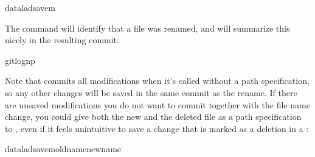 \begin{sphinxVerbatim}[commandchars=\\\{\}]
dataladsave\PYGZhy{}m
\end{sphinxVerbatim}

\sphinxAtStartPar
The  command will identify that a file was
renamed, and will summarize this nicely in the resulting commit:

%
\begin{sphinxVerbatim}[commandchars=\\\{\}]
gitlog\PYGZhy{}n\PYGZhy{}p


\end{sphinxVerbatim}
\sphinxresetverbatimhllines

\sphinxAtStartPar
Note that  commits all modifications when
it’s called without a path specification,
so any other changes will be saved in the same commit as the rename.
If there are unsaved modifications you do not want to commit
together with the file name change, you could give both the
new and the deleted file as a path specification to
, even if it feels unintuitive to
save a change that is marked as a deletion in a
:

\begin{sphinxVerbatim}[commandchars=\\\{\}]
dataladsave\PYGZhy{}moldnamenewname
\end{sphinxVerbatim}

